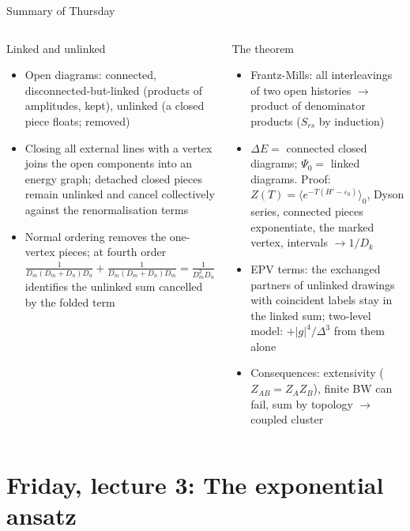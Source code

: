 \documentclass[aspectratio=169,10pt]{beamer}
\newcommand{\av}[1]{\langle #1\rangle_0}
\begin{document}
\begin{frame}{Summary of Thursday}
\footnotesize
\begin{columns}[T]
\begin{block}{Linked and unlinked}
\begin{itemize}
\item Open diagrams: connected, disconnected-but-linked (products of amplitudes, kept), unlinked (a closed piece floats; removed)
\item Closing all external lines with a vertex joins the open components into an energy graph; detached closed pieces remain unlinked and cancel collectively against the renormalisation terms
\item Normal ordering removes the one-vertex pieces; at fourth order $\frac1{D_m(D_m+D_n)D_n}+\frac1{D_m(D_m+D_n)D_m}=\frac1{D_m^2D_n}$ identifies the unlinked sum cancelled by the folded term
\end{itemize}
\end{block}
\begin{block}{The theorem}
\begin{itemize}
\item Frantz-Mills: all interleavings of two open histories $\to$ product of denominator products ($S_{rs}$ by induction)
\item $\Delta E=$ connected closed diagrams; $\Psi_0=$ linked diagrams. Proof: $Z(T)=\av{e^{-T(H'-\varepsilon_0)}}$, Dyson series, connected pieces exponentiate, the marked vertex, intervals $\to1/D_k$
\item EPV terms: the exchanged partners of unlinked drawings with coincident labels stay in the linked sum; two-level model: $+|g|^4/\Delta^3$ from them alone
\item Consequences: extensivity ($Z_{AB}=Z_AZ_B$), finite BW can fail, sum by topology $\to$ coupled cluster
\end{itemize}
\end{block}
\end{columns}
\end{frame}


\section[Friday 3: Coupled cluster]{Friday, lecture 3: The exponential ansatz}
\end{document}
